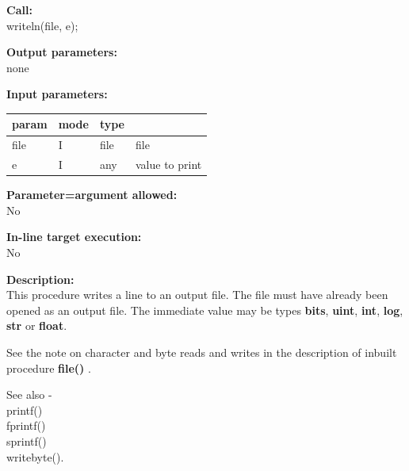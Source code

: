         {\bf Call:} \\
        writeln(file, e);
        
        {\bf Output parameters:} \\
        none
        
        {\bf Input parameters:} \\
        \begin{tabular}{| l | l | l | l |}
        \hline
        param  & mode & type  & \\
        \hline \hline
        file & I & file & file              \\ \hline
        e    & I & any  & value to print    \\ \hline
        \end{tabular}
        
        {\bf Parameter=argument allowed:} \\
        No
        
        {\bf In-line target execution:} \\
        No
        
        {\bf Description:} \\
        This procedure writes a line to an output file. The file
        must have already been opened as an output file. The immediate
        value may be types {\bf bits}, {\bf uint}, {\bf int}, {\bf log},
        {\bf str} or {\bf float}.
        
        See the note on character and byte reads and writes in the description
        of inbuilt procedure {\bf file()} .

        See also - \\
        printf() \\
        fprintf() \\
        sprintf() \\
        writebyte().




